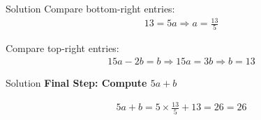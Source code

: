 \documentclass{beamer}
\begin{document}
\begin{frame}{Solution}
Compare bottom-right entries:
\begin{align}
13 = 5a \Rightarrow a = \frac{13}{5}
\end{align}

Compare top-right entries:
\begin{align}
15a - 2b = b \Rightarrow 15a = 3b \Rightarrow b = 13
\end{align}
\end{frame}

\begin{frame}{Solution}
\textbf{Final Step: Compute $5a + b$}

\begin{align}
5a + b = 5 \times \frac{13}{5} + 13 = 26 = \boxed{26}
\end{align}

\end{frame}
\end{document}
